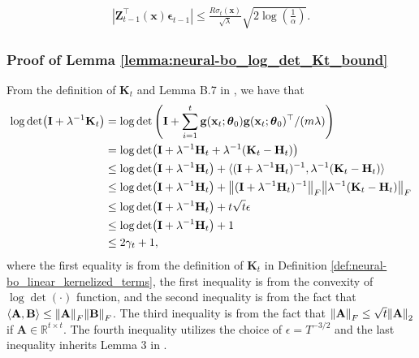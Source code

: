 \begin{equation*}
    \begin{split}
        \left \lvert \mathbf{Z}_{t-1}^\top(\mathbf{x})\boldsymbol{\epsilon}_{t-1} \right \rvert \leq \frac{R\sigma_t(\mathbf{x})}{\sqrt{\lambda}} \sqrt{2 \log(\frac{1}{\alpha})}.
    \end{split}
\end{equation*}

\subsubsection{Proof of Lemma \ref{lemma:neural-bo_log_det_Kt_bound}}
\label{section:neural-bo_log_det_Kt_bound_proof}

From the definition of $\mathbf{K}_t$ and Lemma B.7 in \citet{zhou2020neural}, we have that
\begin{equation*}
\begin{split}
    \log \det(\mathbf{I}+\lambda^{-1}\mathbf{K}_{t})
    & = \log\det \left(\mathbf{I}+\sum_{i=1}^{t}\mathbf{g}({\mathbf{x}_t};\boldsymbol{\theta}_0)\mathbf{g}({\mathbf{x}_t};\boldsymbol{\theta}_0)^\top/(m\lambda)\right) \\
    & = \log \det(\mathbf{I}+\lambda^{-1}\mathbf{H}_t + \lambda^{-1}(\mathbf{K}_t - \mathbf{H}_t))\\
    & \leq \log \det (\mathbf{I}+\lambda^{-1}\mathbf{H}_t)  + \langle (\mathbf{I}+\lambda^{-1}\mathbf{H}_t)^{-1}, \lambda^{-1}(\mathbf{K}_t - \mathbf{H}_t) \rangle \\
    & \leq \log \det (\mathbf{I}+\lambda^{-1}\mathbf{H}_t)  + \norm{(\mathbf{I}+\lambda^{-1}\mathbf{H}_t)^{-1}}_F \norm{ \lambda^{-1}(\mathbf{K}_t - \mathbf{H}_t)}_F \\
    & \leq \log \det (\mathbf{I}+\lambda^{-1}\mathbf{H}_t) + t\sqrt{t} \epsilon \\
    & \leq \log \det (\mathbf{I}+\lambda^{-1}\mathbf{H}_t) + 1 \\
    & \leq 2 \gamma_t + 1, 
\end{split}
\end{equation*}
where the first equality is from the definition of $\mathbf{K}_t$ in Definition \ref{def:neural-bo_linear_kernelized_terms}, the first inequality is from the convexity of $\log \det(\cdot)$ function,
and the second inequality is from the fact that $\langle \mathbf{A}, \mathbf{B} \rangle \le \norm{\mathbf{A}}_F \norm{\mathbf{B}}_F$. The third inequality is
from the fact that $\norm{\mathbf{A}}_F \le \sqrt{t} \norm{\mathbf{A}}_2$ if $\mathbf{A} \in \mathbb{R}^{t \times t}$. The fourth inequality utilizes the choice of $\epsilon = T^{-3/2}$ and the last inequality inherits Lemma 3 in \citet{chowdhury2017kernelized}.


